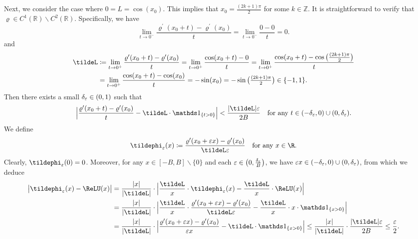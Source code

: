 \documentclass[11pt,a4paper]{article}
\begin{document}
Next, we consider the case where \( 0 = L = \cos(x_0) \). This implies that  
\( x_0 = \frac{(2k + 1)\pi}{2} \) for some \( k \in \mathbb{Z} \).  
It is straightforward to verify that \( \varrho \in C^1(\mathbb{R}) \backslash C^2(\mathbb{R}) \).  
Specifically, we have  
\begin{equation*}
    \lim_{t \to 0^-} \frac{\varrho^\prime(x_0 + t) - \varrho^\prime(x_0)}{t}
    =\lim_{t \to 0^-} \frac{0-0}{t}= 0.
\end{equation*}
and
\begin{equation*}
\begin{split}
        \tildeL &\coloneqq\lim_{t \to 0^+} \frac{\varrho^\prime(x_0 + t) - \varrho^\prime(x_0)}{t}
    =\lim_{t \to 0^+} \frac{\cos(x_0 + t) - 0}{t}
    =\lim_{t \to 0^+} \frac{\cos(x_0 + t) - \cos\big(\tfrac{(2k + 1)\pi}{2}\big)}{t}
   \\& =\lim_{t \to 0^+} \frac{\cos(x_0 + t) - \cos(x_0)}{t}=-\sin(x_0)=-\sin\big(\tfrac{(2k + 1)\pi}{2}\big)\in \{-1,1\}.
\end{split}
\end{equation*}
Then there exists a small $\delta_\varepsilon\in (0,1)$ such that
\begin{equation*}%
	\Big|\frac{\varrho^\prime  (x_0+t  )-\varrho^\prime  (x_0)}{t}- \tildeL \cdot\one_{\{t>0\}} \Big|
	<\frac{|\tildeL|\eps}{ 2B }
    \quad \tn{for any $t\in (-\delta_\eps,0)\cup(0,\delta_\eps)$.}
\end{equation*}
We define  
\begin{equation*}
	\tildephi_{\eps}(x)\coloneqq\frac{\varrho^\prime  (x_0+\eps x)-\varrho^\prime  (x_0)}{\tildeL\eps}\quad \tn{for any $x\in \R$.}
\end{equation*}
Clearly, $\tildephi_\eps(0)=0$. Moreover, for any $x\in [-B,B]\backslash \{0\}$ and each $\varepsilon\in \big(0,\tfrac{\delta_\varepsilon}{B}\big)$, we have $\varepsilon x\in (-\delta_\varepsilon,0)\cup(0,\delta_\varepsilon)$,	
from which we deduce
\begin{equation*}
	\begin{split}
    \big|\tildephi_\eps(x)-\ReLU(x)\big|
   & =\frac{|x|}{|\tildeL|}\cdot\Big|\frac{\tildeL}{x}\cdot \tildephi_\eps(x)-\frac{\tildeL}{x}\cdot\ReLU(x)\Big|
\\& =\frac{|x|}{|\tildeL|}\cdot\Big|\frac{\tildeL}{x}\cdot \frac{\varrho^\prime  (x_0+\eps x)-\varrho^\prime  (x_0)}{\tildeL\eps}-\frac{\tildeL}{x}\cdot  x\cdot \one_{\{x>0\}}\Big|
\\& =\frac{|x|}{|\tildeL|}\cdot\Big|  \frac{\varrho^\prime  (x_0+\eps x)-\varrho^\prime  (x_0)}{ \eps  x}-{\tildeL}\cdot \one_{\{x>0\}}\Big|
\le 
\frac{|x|}{|\tildeL|}\cdot \frac{|\tildeL|\eps}{2B}\le \frac{\eps}{2}.
	\end{split}
\end{equation*}
\end{document}
